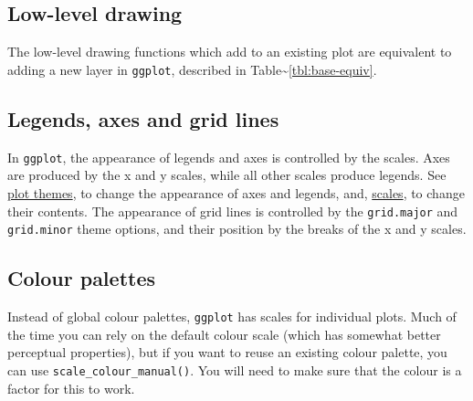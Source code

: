 \subsection{Low-level drawing}

The low-level drawing functions which add to an existing plot are
equivalent to adding a new layer in \texttt{ggplot}, described in
Table\textasciitilde{}\ref{tbl:base-equiv}.

\begin{Shaded}
\begin{Highlighting}[]

\StringTok{ }\NormalTok{()}

\NormalTok{() +}\StringTok{ }\NormalTok{()}
\end{Highlighting}
\end{Shaded}

\subsection{Legends, axes and grid lines}

In \texttt{ggplot}, the appearance of legends and axes is controlled by
the scales. Axes are produced by the x and y scales, while all other
scales produce legends. See \hyperref[sec:themes]{plot themes}, to
change the appearance of axes and legends, and,
\hyperref[sec:guides]{scales}, to change their contents. The appearance
of grid lines is controlled by the \texttt{grid.major} and
\texttt{grid.minor} theme options, and their position by the breaks of
the x and y scales.

\subsection{Colour palettes}

Instead of global colour palettes, \texttt{ggplot} has scales for
individual plots. Much of the time you can rely on the default colour
scale (which has somewhat better perceptual properties), but if you want
to reuse an existing colour palette, you can use
\texttt{scale\_colour\_manual()}. You will need to make sure that the
colour is a factor for this to work. 

